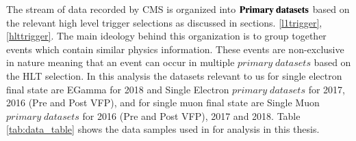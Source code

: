 The stream of data recorded by CMS \cite{Chatrchyan:cms_detetectors} is organized into $\bf{Primary \: datasets}$ based on the relevant high level trigger selections as discussed in sections. \ref{l1trigger}, \ref{hlttrigger}. The main ideology behind this organization is to group together events which contain similar physics information. These events are non-exclusive in nature meaning that an event can occur in multiple $primary \;datasets$ based on the HLT selection. In this analysis the datasets relevant to us for single electron final state are EGamma for 2018 and Single Electron $primary \;datasets$ for 2017, 2016 (Pre and Post VFP), and for single muon final state are Single Muon $primary \;datasets$ for 2016 (Pre and Post VFP), 2017 and 2018. Table \ref{tab:data_table} shows the data samples used in for analysis in this thesis.

